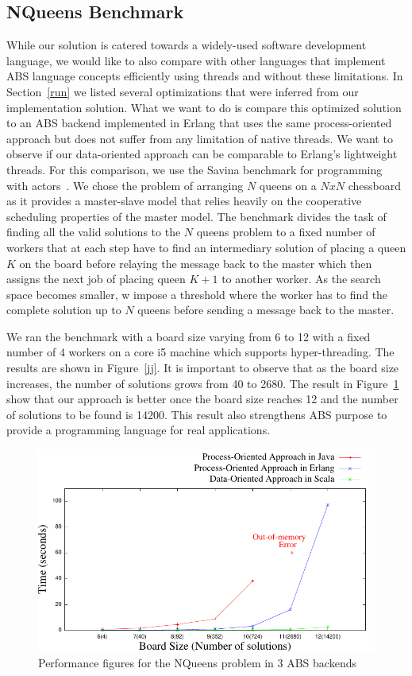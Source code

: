 \subsection{NQueens Benchmark}
\par While our solution is catered towards a widely-used software development language, we would like to also compare with other languages that implement ABS language concepts efficiently using threads and without these limitations. In Section~\ref{run} we listed several optimizations that were inferred from our implementation solution. What we want to do is compare this optimized solution to an ABS backend implemented in Erlang that uses the same process-oriented approach but does not suffer from any limitation of native threads. We want to observe if our data-oriented approach can be comparable to Erlang's lightweight threads. For this comparison, we use the Savina benchmark for programming with actors~\cite{savina}.  We chose the problem of arranging $N$ queens on a $NxN$ chessboard as it provides a master-slave model that relies heavily on the cooperative scheduling properties of the master model.  The benchmark divides the task of finding all the valid solutions to the $N$ queens problem to a fixed number of workers that at each step have to find an intermediary solution of placing a queen $K$ on the board before relaying the message back to the master which then assigns the next job of placing queen $K+1$ to another worker. As the search space becomes smaller, w impose a threshold where the worker has to find the complete solution up to $N$ queens before sending a message back to the master. 
\par We ran the benchmark with a board size varying from 6 to 12 with a fixed number of 4 workers on a core i5 machine which supports hyper-threading. The results are shown in Figure~\ref{jj}. It is important to observe that as the board size increases, the number of solutions grows from 40 to 2680. The result in Figure~\ref{ej} show that our approach is better once the board size reaches 12 and the number of solutions to be found is 14200. This result also strengthens ABS purpose to provide a programming language for real applications.

\begin{figure}
	\centering
	\includegraphics[scale=.7]{erlj8.pdf}
	\caption{Performance figures for the NQueens problem in 3 ABS backends}
	\label{ej}
\end{figure}

